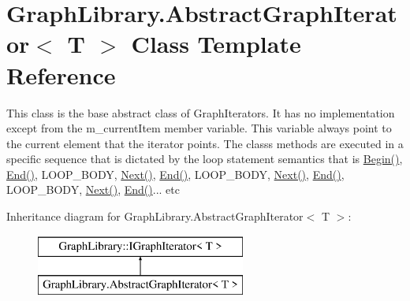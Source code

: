 \hypertarget{class_graph_library_1_1_abstract_graph_iterator}{}\section{Graph\+Library.\+Abstract\+Graph\+Iterator$<$ T $>$ Class Template Reference}
\label{class_graph_library_1_1_abstract_graph_iterator}


This class is the base abstract class of Graph\+Iterators. It has no implementation except from the m\+\_\+current\+Item member variable. This variable always point to the current element that the iterator points. The class\textquotesingle{}s methods are executed in a specific sequence that is dictated by the loop statement semantics that is \hyperlink{class_graph_library_1_1_abstract_graph_iterator_acf5701dde84f76b34a8c2e1d49fa9597}{Begin()}, \hyperlink{class_graph_library_1_1_abstract_graph_iterator_a77e657620d4949f79970ce536e0d2bde}{End()}, L\+O\+O\+P\+\_\+\+B\+O\+D\+Y, \hyperlink{class_graph_library_1_1_abstract_graph_iterator_a93e91fb82d0db03016fb1aef9231365e}{Next()}, \hyperlink{class_graph_library_1_1_abstract_graph_iterator_a77e657620d4949f79970ce536e0d2bde}{End()}, L\+O\+O\+P\+\_\+\+B\+O\+D\+Y, \hyperlink{class_graph_library_1_1_abstract_graph_iterator_a93e91fb82d0db03016fb1aef9231365e}{Next()}, \hyperlink{class_graph_library_1_1_abstract_graph_iterator_a77e657620d4949f79970ce536e0d2bde}{End()}, L\+O\+O\+P\+\_\+\+B\+O\+D\+Y, \hyperlink{class_graph_library_1_1_abstract_graph_iterator_a93e91fb82d0db03016fb1aef9231365e}{Next()}, \hyperlink{class_graph_library_1_1_abstract_graph_iterator_a77e657620d4949f79970ce536e0d2bde}{End()}... etc  


Inheritance diagram for Graph\+Library.\+Abstract\+Graph\+Iterator$<$ T $>$\+:\begin{figure}[H]
\begin{center}
\leavevmode
\includegraphics[height=2.000000cm]{class_graph_library_1_1_abstract_graph_iterator}
\end{center}
\end{figure}
